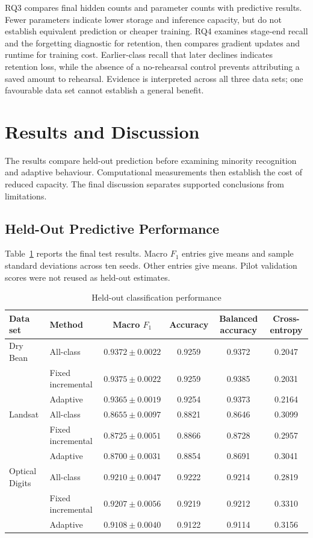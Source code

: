 \documentclass[conference,10pt]{IEEEtran}
\begin{document}
RQ3 compares final hidden counts and parameter counts with predictive results. Fewer parameters indicate lower storage and inference capacity, but do not establish equivalent prediction or cheaper training. RQ4 examines stage-end recall and the forgetting diagnostic for retention, then compares gradient updates and runtime for training cost. Earlier-class recall that later declines indicates retention loss, while the absence of a no-rehearsal control prevents attributing a saved amount to rehearsal. Evidence is interpreted across all three data sets; one favourable data set cannot establish a general benefit.

\section{Results and Discussion}

The results compare held-out prediction before examining minority recognition and adaptive behaviour. Computational measurements then establish the cost of reduced capacity. The final discussion separates supported conclusions from limitations.

\subsection{Held-Out Predictive Performance}

Table~\ref{tab:performance} reports the final test results. Macro $F_1$ entries give means and sample standard deviations across ten seeds. Other entries give means. Pilot validation scores were not reused as held-out estimates.

\begin{table}[t]
\caption{Held-out classification performance}
\label{tab:performance}
\centering
\begin{tabular}{@{}llcccc@{}}
\toprule
Data set & Method & Macro $F_1$ & Accuracy & Balanced accuracy & Cross-entropy \\
\midrule
Dry Bean & All-class & $0.9372\pm0.0022$ & 0.9259 & 0.9372 & 0.2047 \\
 & Fixed incremental & $0.9375\pm0.0022$ & 0.9259 & 0.9385 & 0.2031 \\
 & Adaptive & $0.9365\pm0.0019$ & 0.9254 & 0.9373 & 0.2164 \\
\addlinespace
Landsat & All-class & $0.8655\pm0.0097$ & 0.8821 & 0.8646 & 0.3099 \\
 & Fixed incremental & $0.8725\pm0.0051$ & 0.8866 & 0.8728 & 0.2957 \\
 & Adaptive & $0.8700\pm0.0031$ & 0.8854 & 0.8691 & 0.3041 \\
\addlinespace
Optical Digits & All-class & $0.9210\pm0.0047$ & 0.9222 & 0.9214 & 0.2819 \\
 & Fixed incremental & $0.9207\pm0.0056$ & 0.9219 & 0.9212 & 0.3310 \\
 & Adaptive & $0.9108\pm0.0040$ & 0.9122 & 0.9114 & 0.3156 \\
\bottomrule
\end{tabular}
\end{table}
\end{document}
